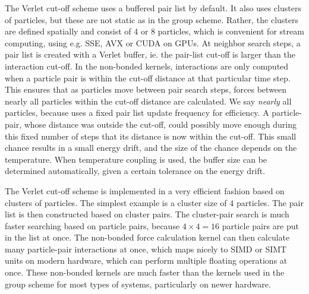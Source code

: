 The Verlet cut-off scheme uses a buffered pair list by default. It
also uses clusters of particles, but these are not static as in the group
scheme. Rather, the clusters are defined spatially and consist of 4 or
8 particles, which is convenient for stream computing, using e.g. SSE, AVX
or CUDA on GPUs. At neighbor search steps, a pair list is created
with a Verlet buffer, ie. the pair-list cut-off is larger than the
interaction cut-off. In the non-bonded kernels, interactions are only
computed when a particle pair is within the cut-off distance at that
particular time step. This ensures that as particles move between pair
search steps, forces between nearly all particles within the cut-off
distance are calculated. We say {\em nearly} all particles, because
{\gromacs} uses a fixed pair list update frequency for
efficiency. A particle-pair, whose distance was outside the cut-off,
could possibly move enough during this fixed number of
steps that its distance is now within the cut-off. This
small chance results in a small energy drift, and the size of the
chance depends on the temperature. When temperature
coupling is used, the buffer size can be determined automatically,
given a certain tolerance on the energy drift.

The Verlet cut-off scheme is implemented in a very efficient fashion
based on clusters of particles. The simplest example is a cluster size
of 4 particles. The pair list is then constructed based on cluster
pairs. The cluster-pair search is much faster searching based on
particle pairs, because $4 \times 4 = 16$ particle pairs are put in
the list at once. The non-bonded force calculation kernel can then
calculate many particle-pair interactions at once, which maps nicely
to SIMD or SIMT units on modern hardware, which can perform multiple
floating operations at once. These non-bonded kernels
are much faster than the kernels used in the group scheme for most
types of systems, particularly on newer hardware.

